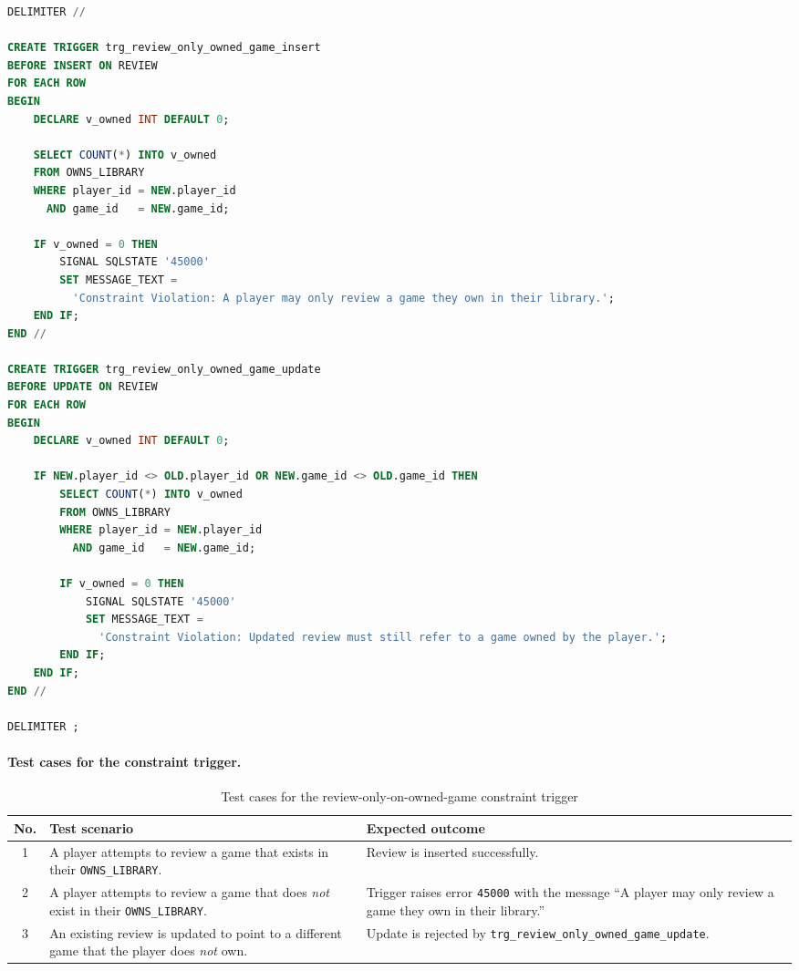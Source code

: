 \begin{lstlisting}[language=SQL, caption={Trigger enforcing the business rule that reviews are allowed only for owned games}, label={lst:trg-review-owned}]
DELIMITER //

CREATE TRIGGER trg_review_only_owned_game_insert
BEFORE INSERT ON REVIEW
FOR EACH ROW
BEGIN
    DECLARE v_owned INT DEFAULT 0;

    SELECT COUNT(*) INTO v_owned
    FROM OWNS_LIBRARY
    WHERE player_id = NEW.player_id
      AND game_id   = NEW.game_id;

    IF v_owned = 0 THEN
        SIGNAL SQLSTATE '45000'
        SET MESSAGE_TEXT =
          'Constraint Violation: A player may only review a game they own in their library.';
    END IF;
END //

CREATE TRIGGER trg_review_only_owned_game_update
BEFORE UPDATE ON REVIEW
FOR EACH ROW
BEGIN
    DECLARE v_owned INT DEFAULT 0;

    IF NEW.player_id <> OLD.player_id OR NEW.game_id <> OLD.game_id THEN
        SELECT COUNT(*) INTO v_owned
        FROM OWNS_LIBRARY
        WHERE player_id = NEW.player_id
          AND game_id   = NEW.game_id;

        IF v_owned = 0 THEN
            SIGNAL SQLSTATE '45000'
            SET MESSAGE_TEXT =
              'Constraint Violation: Updated review must still refer to a game owned by the player.';
        END IF;
    END IF;
END //

DELIMITER ;
\end{lstlisting}

\paragraph{Test cases for the constraint trigger.}

\begin{table}[H]
\centering
\caption{Test cases for the review-only-on-owned-game constraint trigger}
\label{tab:trg-review-owned-tests}
\begin{tabular}{|c|p{6.5cm}|p{5cm}|}
\hline
\textbf{No.} & \textbf{Test scenario} & \textbf{Expected outcome} \\ \hline
1 & A player attempts to review a game that exists in their \texttt{OWNS\_LIBRARY}. & Review is inserted successfully. \\ \hline
2 & A player attempts to review a game that does \emph{not} exist in their \texttt{OWNS\_LIBRARY}. & Trigger raises error \texttt{45000} with the message ``A player may only review a game they own in their library.'' \\ \hline
3 & An existing review is updated to point to a different game that the player does \emph{not} own. & Update is rejected by \texttt{trg\_review\_only\_owned\_game\_update}. \\ \hline
\end{tabular}
\end{table}


